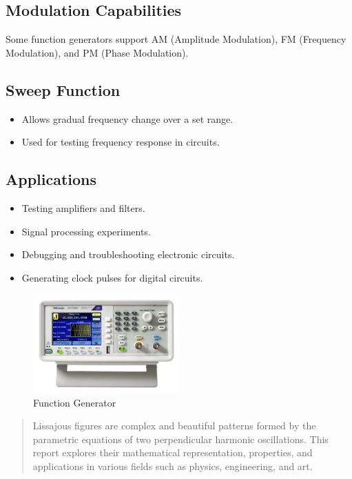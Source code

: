 \documentclass{article}
\begin{document}
\subsection{Modulation Capabilities}
Some function generators support AM (Amplitude Modulation), FM (Frequency Modulation), and PM (Phase Modulation).

\subsection{Sweep Function}
\begin{itemize}
    \item Allows gradual frequency change over a set range.
    \item Used for testing frequency response in circuits.
\end{itemize}

\subsection{Applications}
\begin{itemize}
    \item Testing amplifiers and filters.
    \item Signal processing experiments.
    \item Debugging and troubleshooting electronic circuits.
    \item Generating clock pulses for digital circuits.
\end{itemize}

\begin{figure}[H]
\centering
\includegraphics[width=0.5\textwidth]{figs/func_gen.png}
\caption{Function Generator}
\end{figure}

\begin{abstract}
Lissajous figures are complex and beautiful patterns formed by the parametric equations of two perpendicular harmonic oscillations. This report explores their mathematical representation, properties, and applications in various fields such as physics, engineering, and art.
\end{abstract}
\end{document}
